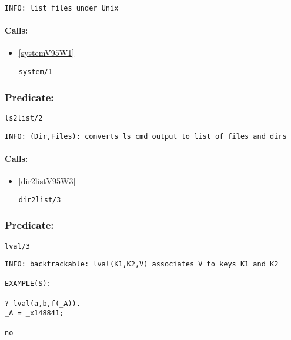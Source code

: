 {\small \begin{verbatim}
INFO: list files under Unix

\end{verbatim}}
\paragraph{Calls:} 
\begin{itemize}
\item \ref{systemV95W1} 
\begin{verbatim}
system/1
\end{verbatim}

\end{itemize}

\subsubsection{Predicate:} \label{ls2listV95W2}

\begin{verbatim}
ls2list/2
\end{verbatim}

{\small \begin{verbatim}
INFO: (Dir,Files): converts ls cmd output to list of files and dirs

\end{verbatim}}
\paragraph{Calls:} 
\begin{itemize}
\item \ref{dir2listV95W3} 
\begin{verbatim}
dir2list/3
\end{verbatim}

\end{itemize}

\subsubsection{Predicate:} \label{lvalV95W3}

\begin{verbatim}
lval/3
\end{verbatim}

{\small \begin{verbatim}
INFO: backtrackable: lval(K1,K2,V) associates V to keys K1 and K2

EXAMPLE(S):

?-lval(a,b,f(_A)).
_A = _x148841;

no

\end{verbatim}}

